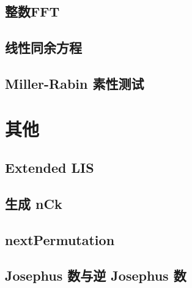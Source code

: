 \documentclass[10pt]{article}
\begin{document}
	\subsection{整数FFT}

	\subsection{线性同余方程}

	\subsection{Miller-Rabin 素性测试}

\section{其他}
	\subsection{Extended LIS}
	
	\subsection{生成 nCk}
	
	\subsection{nextPermutation}
	
	\subsection{Josephus 数与逆 Josephus 数}	
\end{document}
